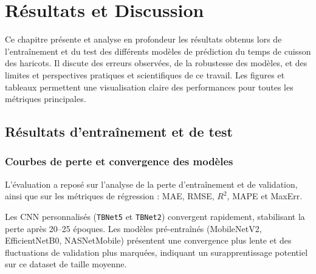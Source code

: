 \chapter{Résultats et Discussion}
\label{chap:resultats_discussion}

Ce chapitre présente et analyse en profondeur les résultats obtenus lors de l’entraînement et du test des différents modèles de prédiction du temps de cuisson des haricots. Il discute des erreurs observées, de la robustesse des modèles, et des limites et perspectives pratiques et scientifiques de ce travail. Les figures et tableaux permettent une visualisation claire des performances pour toutes les métriques principales.

\section{Résultats d’entraînement et de test}
\label{sec:resultats_train_test}

\subsection{Courbes de perte et convergence des modèles}
\label{subsec:loss_curves}

L’évaluation a reposé sur l’analyse de la perte d’entraînement et de validation, ainsi que sur les métriques de régression : MAE, RMSE, $R^2$, MAPE et MaxErr.  

Les CNN personnalisés (\texttt{TBNet5} et \texttt{TBNet2}) convergent rapidement, stabilisant la perte après 20–25 époques. Les modèles pré-entraînés (MobileNetV2, EfficientNetB0, NASNetMobile) présentent une convergence plus lente et des fluctuations de validation plus marquées, indiquant un surapprentissage potentiel sur ce dataset de taille moyenne.

